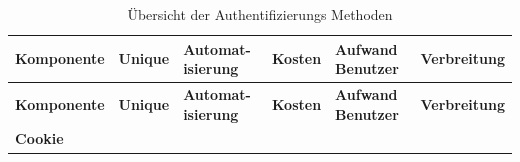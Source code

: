 \begin{longtable}[c]{@{}llllll@{}}
\caption{Übersicht der Authentifizierungs Methoden}\tabularnewline
\toprule
\begin{minipage}[b]{0.19\columnwidth}\raggedright\strut
\textbf{Komponente}
\strut\end{minipage} &
\begin{minipage}[b]{0.11\columnwidth}\raggedright\strut
\textbf{Unique}
\strut\end{minipage} &
\begin{minipage}[b]{0.15\columnwidth}\raggedright\strut
\textbf{Automat- isierung}
\strut\end{minipage} &
\begin{minipage}[b]{0.11\columnwidth}\raggedright\strut
\textbf{Kosten}
\strut\end{minipage} &
\begin{minipage}[b]{0.13\columnwidth}\raggedright\strut
\textbf{Aufwand Benutzer}
\strut\end{minipage} &
\begin{minipage}[b]{0.13\columnwidth}\raggedright\strut
\textbf{Verbreitung}
\strut\end{minipage}\tabularnewline
\midrule
\endfirsthead
\toprule
\begin{minipage}[b]{0.19\columnwidth}\raggedright\strut
\textbf{Komponente}
\strut\end{minipage} &
\begin{minipage}[b]{0.11\columnwidth}\raggedright\strut
\textbf{Unique}
\strut\end{minipage} &
\begin{minipage}[b]{0.15\columnwidth}\raggedright\strut
\textbf{Automat- isierung}
\strut\end{minipage} &
\begin{minipage}[b]{0.11\columnwidth}\raggedright\strut
\textbf{Kosten}
\strut\end{minipage} &
\begin{minipage}[b]{0.13\columnwidth}\raggedright\strut
\textbf{Aufwand Benutzer}
\strut\end{minipage} &
\begin{minipage}[b]{0.13\columnwidth}\raggedright\strut
\textbf{Verbreitung}
\strut\end{minipage}\tabularnewline
\midrule
\endhead
\begin{minipage}[t]{0.19\columnwidth}\raggedright\strut
\textbf{Cookie}
\strut\end{minipage} &
\begin{minipage}[t]{0.11\columnwidth}\raggedright\strut

\end{minipage}
\end{longtable}
